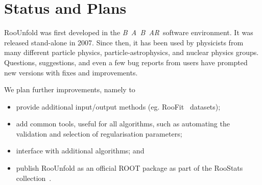\documentclass{desyproc}
\newcommand{\babar}{\mbox{\sl B\hspace{-0.4em} {\small\sl A}\hspace{-0.37em} \sl B\hspace{-0.4em} {\small\sl A\hspace{-0.02em}R}}}
\begin{document}
\section{Status and Plans}

RooUnfold was first developed in the \babar\ software environment.
It was released stand-alone in 2007.
Since then, it has been used by physicists from many
different particle physics, particle-astrophysics, and nuclear physics groups.
Questions, suggestions, and even a few bug reports from users
have prompted new versions with fixes and improvements.

We plan further improvements, namely to

\begin{itemize}

\item provide additional input/output methods (eg. RooFit~\cite{Verkerke:2003ir} datasets);

\item add common tools, useful for all algorithms, such as 
automating the validation and selection of regularisation parameters;

\item interface with additional algorithms; and

\item publish RooUnfold as an official ROOT package as part of the RooStats collection~\cite{RooStats}.
\end{itemize}

\end{document}
